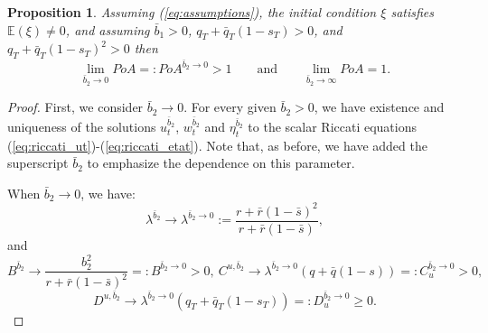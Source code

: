 \documentclass[11pt]{article}
\newtheorem{proposition}{Proposition}
\begin{document}
\begin{proposition}
	Assuming (\ref{eq:assumptions}), the initial condition $\xi$ satisfies $\mathbb{E}(\xi)\neq 0$, and assuming $\bar{b}_1> 0$, $q_T+\bar{q}_T(1-s_T)>0$, and $q_T+\bar{q}_T(1-s_T)^2>0$
	then 
	\begin{equation*}
	\lim_{\bar{b}_2 \to 0} PoA =: PoA^{\bar{b}_2\to 0} > 1\qquad \text{and} \qquad\lim_{\bar{b}_2 \to \infty} PoA = 1.
	\end{equation*}
	\label{prop:b2bar}
\end{proposition}
\begin{proof}
	First, we consider $\bar{b}_2 \to 0$. For every given $\bar{b}_2 >0$, we have existence and uniqueness of the solutions $u^{\bar{b}_2}_t$, $w^{\bar{b}_2}_t$ and $\eta^{\bar{b}_2}_t$ to the scalar Riccati equations (\ref{eq:riccati_ut})-(\ref{eq:riccati_etat}). Note that, as before, we have added the superscript $\bar{b}_2$ to emphasize the dependence on this parameter.
	
	When $\bar{b}_2 \to 0$, we have:
	$$\displaystyle \lambda^{\bar{b}_2} \to \lambda^{\bar{b}_2 \to 0} := \frac{r + \bar{r}(1- \bar{s})^2}{r + \bar{r}(1-\bar{s})},$$
	and 
	$$B^{\bar{b}_2} \to \frac{b_2^2}{r + \bar{r}(1-\bar{s})^2}=:B^{\bar{b}_2 \to 0} > 0,\ C^{u,\bar{b}_2} \to \lambda^{\bar{b}_2 \to 0}(q+\bar{q}(1-s))=:C^{\bar{b}_2 \to 0}_u >0,$$
	$$D^{u,\bar{b}_2} \to \lambda^{\bar{b}_2 \to 0}(q_T+\bar{q}_T(1-s_T))=:D^{\bar{b}_2 \to 0}_u \geq 0.$$
	

\end{proof}
\end{document}
